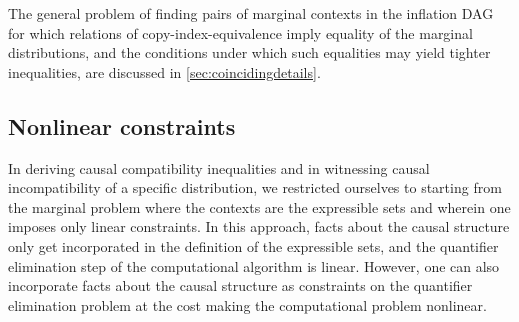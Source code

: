 \documentclass[aps,english,10pt,superscriptaddress,onecolumn,twoside,longbibliography,pra,floatfix,fleqn,nofootinbib]{revtex4-1}%
\theoremstyle{definition}
\begin{document}
The general problem of finding pairs of marginal contexts in the inflation DAG for which relations of copy-index-equivalence imply equality of the marginal distributions, and the conditions under which such equalities may yield tighter inequalities, are discussed in \cref{sec:coincidingdetails}.


\subsection{Nonlinear constraints} 

\color{blue}
In deriving causal compatibility inequalities and in witnessing causal incompatibility of a specific distribution, we restricted ourselves to starting from the marginal problem where the contexts are the expressible sets and wherein one imposes only linear constraints.  In this approach, facts about the causal structure only get incorporated in the definition of the expressible sets, and the quantifier elimination step of the computational algorithm is linear.  However, one can also incorporate facts about the causal structure as constraints on the quantifier elimination problem at the cost making the computational problem nonlinear. 
\end{document}
